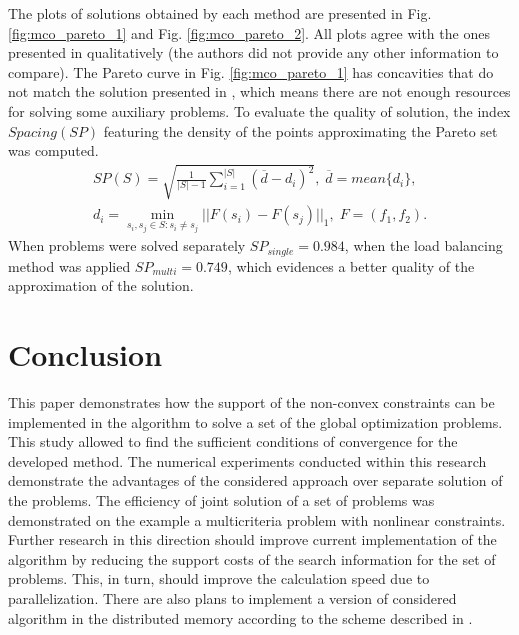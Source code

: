\documentclass[runningheads]{llncs}
\begin{document}
The plots of solutions obtained by each method are presented in Fig. \ref{fig:mco_pareto_1}
and Fig. \ref{fig:mco_pareto_2}.
All plots agree with the ones presented in \cite{BinhKorn1999} qualitatively (the authors
did not provide any other information to compare).
The Pareto curve in Fig. \ref{fig:mco_pareto_1} has concavities that do not
match the solution presented in \cite{BinhKorn1999}, which means there are not enough resources for solving some auxiliary problems.
To evaluate the quality of solution, the index \(Spacing(SP)\) \cite{RiquelmeLucken2015}
featuring the density of the points approximating the Pareto set was computed.
\begin{equation*}
\begin {array}{l}
  SP(S)=\sqrt{\frac{1}{|S|-1} \sum_{i=1}^{|S|} (\overline{d}-d_i)^2},
  \; \overline{d}=mean\{d_i\},
  \\d_i=\min_{s_i,s_j\in S:s_i\ne s_j}||F(s_i)-F(s_j)||_1,\; F=(f_1,f_2).
  \end{array}
\end{equation*}
When problems were solved separately  \(SP_{single}=0.984\), when the load balancing method was
applied  \(SP_{multi}=0.749\), which evidences a better quality of the approximation
of the solution.

\section{Conclusion}

This paper demonstrates how the support of the non-convex constraints can be implemented
in the algorithm to solve a set of the global optimization problems.
This study allowed to find the sufficient conditions of convergence for the developed method.
The numerical experiments conducted within this research demonstrate the advantages
of the considered approach over separate solution of the problems.
The efficiency of joint solution of a set of problems was demonstrated on the example a
multicriteria problem with nonlinear constraints.
Further research in this direction should improve current implementation
of the algorithm by reducing the support costs of the search information for
the set of problems. This, in turn, should improve the calculation speed
due to parallelization. There are also plans to implement a version of considered algorithm in the distributed memory according to the scheme described in  \cite{BarkalovLebedev2017_2}.

%
%
%


%
\end{document}
